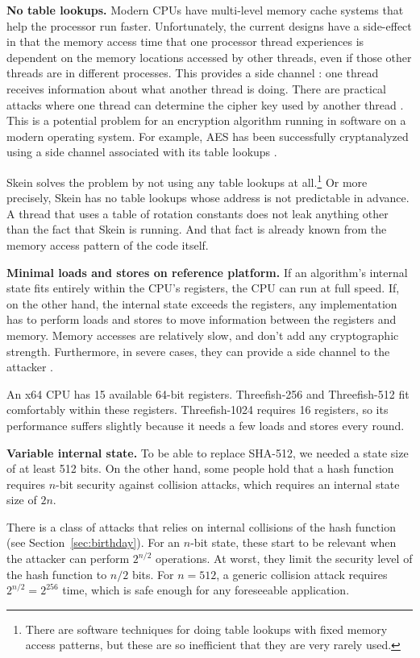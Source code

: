 \documentclass[11pt,twoside]{article}
\begin{document}
{\bf No table lookups.}  Modern CPUs have multi-level memory cache systems that help the processor run faster.  Unfortunately, the current designs have a side-effect in that the memory access time that one processor thread experiences is dependent on the memory locations accessed by other threads, even if those other threads are in different processes.  This provides a side channel \cite{KSWH00}: one thread receives information about what another thread is doing.  There are practical attacks where one thread can determine the cipher key used by another thread \cite{Per05}.  This is a potential problem for an encryption algorithm running in software on a modern operating system.  For example, AES has been successfully cryptanalyzed using a side channel associated with its table lookups \cite{Ber05,BM06}.

Skein solves the problem by not using any table lookups at all.\footnote{There are software techniques for doing table lookups with fixed memory access patterns, but these are so inefficient that they are very rarely used.}  Or more precisely, Skein has no table lookups whose address is not predictable in advance.  A thread that uses a table of rotation constants does not leak anything other than the fact that Skein is running.  And that fact is already known from the memory access pattern of the code itself.

{\bf Minimal loads and stores on reference platform.}  If an algorithm's internal state fits entirely within the CPU's registers, the CPU can run at full speed.  If, on the other hand, the internal state exceeds the registers, any implementation has to perform loads and stores to move information between the registers and memory.  Memory accesses are relatively slow, and don't add any cryptographic strength.  Furthermore, in severe cases, they can provide a side channel to the attacker \cite{Koc96,Koc99,KSWH00}.

An x64 CPU has 15 available 64-bit registers.  Threefish-256 and Threefish-512 fit comfortably within these registers.  Threefish-1024 requires 16 registers, so its performance suffers slightly because it needs a few loads and stores every round.

{\bf Variable internal state.}  To be able to replace SHA-512, we needed a state size of at least 512 bits.  On the other hand, some people hold that a hash function requires $n$-bit security against collision attacks, which requires an internal state size of $2n$.

There is a class of attacks that relies on internal collisions of the hash function (see Section~\ref{sec:birthday}).  For an $n$-bit state, these start to be relevant when the attacker can perform $2^{n/2}$ operations. At worst, they limit the security level of the hash function to $n/2$ bits.  For $n=512$, a generic collision attack requires $2^{n/2}=2^{256}$ time, which is safe enough for any foreseeable application.
\end{document}
